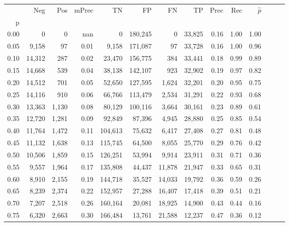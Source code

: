 \begin{tabular}{rrrrrrrrrrrrrr}
\toprule
{} &     Neg &    Pos & mPrec &       TN &       FP &      FN &      TP &  Prec &   Rec & $\hat{p}$ \\
p    &         &        &       &          &          &         &         &       &       &           \\
\midrule
0.00 &       0 &      0 &   nan &        0 &  180,245 &       0 &  33,825 &  0.16 &  1.00 &      1.00 \\
0.05 &   9,158 &     97 &  0.01 &    9,158 &  171,087 &      97 &  33,728 &  0.16 &  1.00 &      0.96 \\
0.10 &  14,312 &    287 &  0.02 &   23,470 &  156,775 &     384 &  33,441 &  0.18 &  0.99 &      0.89 \\
0.15 &  14,668 &    539 &  0.04 &   38,138 &  142,107 &     923 &  32,902 &  0.19 &  0.97 &      0.82 \\
0.20 &  14,512 &    701 &  0.05 &   52,650 &  127,595 &   1,624 &  32,201 &  0.20 &  0.95 &      0.75 \\
0.25 &  14,116 &    910 &  0.06 &   66,766 &  113,479 &   2,534 &  31,291 &  0.22 &  0.93 &      0.68 \\
0.30 &  13,363 &  1,130 &  0.08 &   80,129 &  100,116 &   3,664 &  30,161 &  0.23 &  0.89 &      0.61 \\
0.35 &  12,720 &  1,281 &  0.09 &   92,849 &   87,396 &   4,945 &  28,880 &  0.25 &  0.85 &      0.54 \\
0.40 &  11,764 &  1,472 &  0.11 &  104,613 &   75,632 &   6,417 &  27,408 &  0.27 &  0.81 &      0.48 \\
0.45 &  11,132 &  1,638 &  0.13 &  115,745 &   64,500 &   8,055 &  25,770 &  0.29 &  0.76 &      0.42 \\
0.50 &  10,506 &  1,859 &  0.15 &  126,251 &   53,994 &   9,914 &  23,911 &  0.31 &  0.71 &      0.36 \\
0.55 &   9,557 &  1,964 &  0.17 &  135,808 &   44,437 &  11,878 &  21,947 &  0.33 &  0.65 &      0.31 \\
0.60 &   8,910 &  2,155 &  0.19 &  144,718 &   35,527 &  14,033 &  19,792 &  0.36 &  0.59 &      0.26 \\
0.65 &   8,239 &  2,374 &  0.22 &  152,957 &   27,288 &  16,407 &  17,418 &  0.39 &  0.51 &      0.21 \\
0.70 &   7,207 &  2,518 &  0.26 &  160,164 &   20,081 &  18,925 &  14,900 &  0.43 &  0.44 &      0.16 \\
0.75 &   6,320 &  2,663 &  0.30 &  166,484 &   13,761 &  21,588 &  12,237 &  0.47 &  0.36 &      0.12 \\

\end{tabular}
